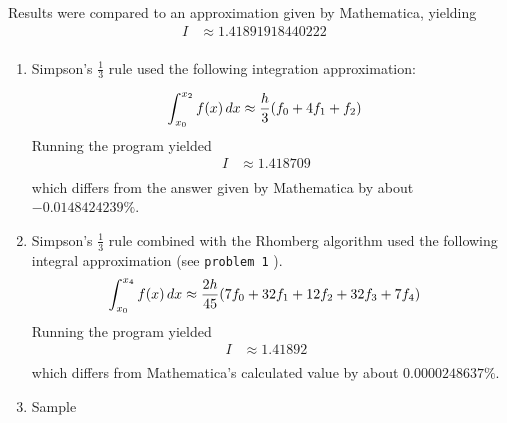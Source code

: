 \documentclass[12pt]{article}
\DeclarePairedDelimiter\rb{(}{)}
\begin{document}
Results were compared to an approximation given by Mathematica, yielding 
\begin{align*}
    I & \approx  \!1.41891918440222 &\\
\end{align*}

\begin{enumerate}[label=(\alph*)]
    \item Simpson's \(\frac{1}{3}\) rule used the following integration approximation:

        \begin{align*}
            \int_{x_{0}}^{x_{2}} {f \rb*{x}} \,d x & \approx
            \frac{h}{3} \rb*{f_{0} + 4 f_{1} + f_{2}}  &\\
        \end{align*}
Running the program yielded
\begin{align*}
    I & \approx 1.418709 &\\
\end{align*}
which differs from the answer given by Mathematica by about \(-0.0148424239 \%\).

    \item Simpson's \(\frac{1}{3}\) rule combined with the Rhomberg algorithm used the following integral approximation (see \texttt{problem 1} ).
        \begin{align*}
            \int_{x_{0}}^{x_{4}} {f \rb*{x}} \,d x & \approx
            \frac{2 h }{45} \rb*{ 7 f_{0} + 32 f_{1} + 12 f_{2} + 32 f_{3} + 7 f_{4}} &\\
        \end{align*}
        Running the program yielded
        \begin{align*}
            I & \approx 1.41892 &\\
        \end{align*}
        which differs from Mathematica's calculated value by about \(0.0000248637 \%\).
    \item Sample

\end{enumerate} 
\end{document}
